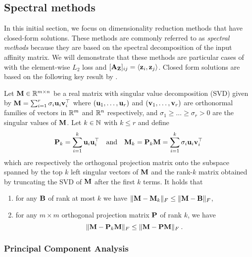 \subsection{Spectral methods}\label{sec:spectral_methods}

In this initial section, we focus on dimensionality reduction methods that have closed-form solutions. These methods are commonly referred to as \emph{spectral methods} because they are based on the spectral decomposition of the input affinity matrix. We will demonstrate that these methods are particular cases of  with the element-wise $L_2$ loss and $[{\mathbf{A}}_{{\mathbf{Z}}}]_{ij} = \langle {\mathbf{z}}_i, {\mathbf{z}}_j \rangle$. Closed form solutions are based on the following key result by \cite{eckart1936approximation}.

\begin{theorem}{\cite{eckart1936approximation}}\label{thm:eckart}
	Let ${\mathbf{M}} \in \mathbb{R}^{m \times n}$ be a real matrix with singular value decomposition (SVD) given by ${\mathbf{M}} = \sum_{i=1}^{r} \sigma_i {\mathbf{u}}_i {\mathbf{v}}_i^\top$ where $({\mathbf{u}}_1, \dots, {\mathbf{u}}_r)$ and $({\mathbf{v}}_1, \dots, {\mathbf{v}}_r)$ are orthonormal families of vectors in $\mathbb{R}^m$ and $\mathbb{R}^n$ respectively, and $\sigma_1 \geq \dots \geq \sigma_r > 0$ are the singular values of ${\mathbf{M}}$. Let $k \in \mathbb{N}$ with $k \leq r$ and define 
	\begin{align}
		{\mathbf{P}}_k = \sum_{i=1}^{k} {\mathbf{u}}_i {\mathbf{u}}_i^\top \quad \text{and} \quad {\mathbf{M}}_k = {\mathbf{P}}_k {\mathbf{M}} = \sum_{i=1}^{k} \sigma_i {\mathbf{u}}_i {\mathbf{v}}_i^\top
	\end{align}
	which are respectively the orthogonal projection matrix onto the subspace spanned by the top $k$ left singular vectors of ${\mathbf{M}}$ and the rank-$k$ matrix obtained by truncating the SVD of ${\mathbf{M}}$ after the first $k$ terms. It holds that
	\begin{enumerate}[label=(\alph*)]
        \item for any ${\mathbf{B}}$ of rank at most $k$ we have $\| {\mathbf{M}} - {\mathbf{M}}_k \|_F \leq \| {\mathbf{M}} - {\mathbf{B}} \|_F$,
        \item for any $m \times m$ orthogonal projection matrix ${\mathbf{P}}$ of rank $k$, we have $$\| {\mathbf{M}} - {\mathbf{P}}_k {\mathbf{M}} \|_F \leq \| {\mathbf{M}} - {\mathbf{P}} {\mathbf{M}} \|_F \: .$$
    \end{enumerate} 
\end{theorem}

\subsubsection{Principal Component Analysis}

